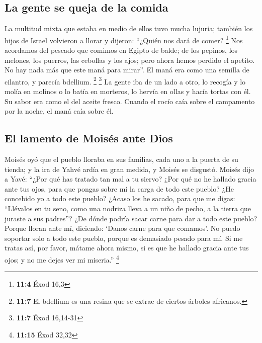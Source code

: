 \hypertarget{la-gente-se-queja-de-la-comida}{%
\subsection{La gente se queja de la
comida}\label{la-gente-se-queja-de-la-comida}}

 La multitud mixta que estaba en medio de ellos tuvo mucha
lujuria; también los hijos de Israel volvieron a llorar y dijeron:
``¿Quién nos dará de comer? \footnote{\textbf{11:4} Éxod 16,3}
 Nos acordamos del pescado que comimos en Egipto de balde;
de los pepinos, los melones, los puerros, las cebollas y los ajos;
 pero ahora hemos perdido el apetito. No hay nada más que
este maná para mirar''.  El maná era como una semilla de
cilantro, y parecía bdellium. \footnote{\textbf{11:7} El bdellium es una
  resina que se extrae de ciertos árboles africanos.} \footnote{\textbf{11:7}
  Éxod 16,14-31}  La gente iba de un lado a otro, lo
recogía y lo molía en molinos o lo batía en morteros, lo hervía en ollas
y hacía tortas con él. Su sabor era como el del aceite fresco.
 Cuando el rocío caía sobre el campamento por la noche, el
maná caía sobre él.

\hypertarget{el-lamento-de-moisuxe9s-ante-dios}{%
\subsection{El lamento de Moisés ante
Dios}\label{el-lamento-de-moisuxe9s-ante-dios}}

 Moisés oyó que el pueblo lloraba en sus familias, cada
uno a la puerta de su tienda; y la ira de Yahvé ardía en gran medida, y
Moisés se disgustó.  Moisés dijo a Yavé: ``¿Por qué has
tratado tan mal a tu siervo? ¿Por qué no he hallado gracia ante tus
ojos, para que pongas sobre mí la carga de todo este pueblo?
 ¿He concebido yo a todo este pueblo? ¿Acaso los he
sacado, para que me digas: ``Llévalos en tu seno, como una nodriza lleva
a un niño de pecho, a la tierra que juraste a sus padres''?
 ¿De dónde podría sacar carne para dar a todo este
pueblo? Porque lloran ante mí, diciendo: `Danos carne para que comamos'.
 No puedo soportar solo a todo este pueblo, porque es
demasiado pesado para mí.  Si me tratas así, por favor,
mátame ahora mismo, si es que he hallado gracia ante tus ojos; y no me
dejes ver mi miseria.'' \footnote{\textbf{11:15} Éxod 32,32}

